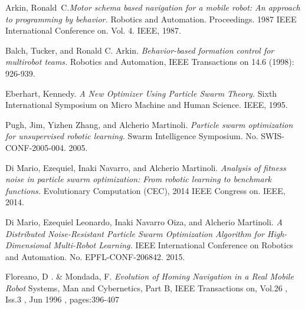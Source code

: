 \documentclass[journal]{IEEEtran}
\begin{document}
%
%
%
\begin{thebibliography}{1}

Arkin, Ronald~C.\emph{Motor schema based navigation for a mobile
  robot: An approach to programming by behavior.} 
Robotics and Automation. Proceedings. 1987 IEEE International Conference on. Vol. 4. IEEE, 1987.

Balch, Tucker, and Ronald C. Arkin. \emph{Behavior-based formation
  control for multirobot teams.}
 Robotics and Automation, IEEE Transactions on 14.6 (1998): 926-939.
 
Eberhart, Kennedy. \emph{A New Optimizer Using Particle Swarm Theory.}
 Sixth International Symposium on Micro Machine and Human Science. IEEE, 1995.

Pugh, Jim, Yizhen Zhang, and Alcherio Martinoli. \emph{Particle swarm
  optimization for unsupervised robotic learning.}
 Swarm Intelligence Symposium. No. SWIS-CONF-2005-004. 2005.

Di Mario, Ezequiel, Inaki Navarro, and Alcherio
Martinoli. \emph{Analysis of fitness noise in particle swarm
  optimization: From robotic learning to benchmark functions.}
 Evolutionary Computation (CEC), 2014 IEEE Congress on. IEEE, 2014.

Di Mario, Ezequiel Leonardo, Inaki Navarro Oiza, and Alcherio
Martinoli. 
\emph{A Distributed Noise-Resistant Particle Swarm Optimization
  Algorithm for High-Dimensional Multi-Robot Learning.}
 IEEE International Conference on Robotics and Automation. No. EPFL-CONF-206842. 2015.

Floreano, D . \& Mondada, F. \emph{Evolution of Homing Navigation in a Real
Mobile Robot} Systems, Man and Cybernetics, Part B, IEEE Transactions
on, Vol.26 , Iss.3 , Jun 1996 , pages:396-407

\end{thebibliography}
\end{document}

